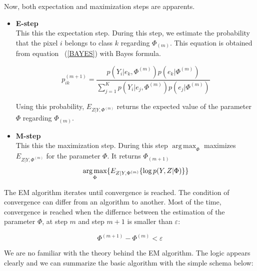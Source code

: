 Now, both expectation and maximization steps are apparents.\\
\begin{itemize}
\item \textbf{E-step}\\
This this the expectation step. During this step, we estimate the probability that the pixel $i$ belongs to class $k$ regarding $\Phi_{(m)}$. This equation is obtained from equation ~(\ref{BAYES}) with Bayes formula.

  \begin{equation}\label{ESTEP1}
  p_{ik}^{(m+1)} = \frac{p(Y_i|e_k,\Phi^{(m)})p(e_k|\Phi^{(m)})}{\sum_{j=1}^K   p(Y_i|e_j,\Phi^{(m)}) p(e_{j}|\Phi^{(m)})}  
  \end{equation}

Using this probability, $E_{Z|Y,\Phi^{(m)}}$ returns the expected value of the parameter $\Phi$ regarding $\Phi_{(m)}$.\\


\item \textbf{M-step}\\
This this the maximization step. During this step $\operatorname*{arg\,max}_\Phi$ maximizes $E_{Z|Y,\Phi^{(m)}}$ for the parameter $\Phi$. It returns $\Phi_{(m+1)}$
  \begin{equation}
  \operatorname*{arg\,max}_\Phi \{ E_{Z|Y,\Phi^{(m)}} \{\operatorname*{log} p(Y,Z|\Phi)\}\}\\
  \end{equation}
 
\end{itemize} 
  
The EM algorithm iterates until convergence is reached. The condition of convergence can differ from an algorithm to another. Most of the time, convergence is reached when the differnce between the estimation of the parameter $\Phi$, at step $m$ and step $m+1$ is smaller than $\varepsilon$:

  \begin{equation*}
  \Phi^{(m+1)}-\Phi^{(m)} < \varepsilon
  \end{equation*}
  
  
  We are no familiar with the theory behind the EM algorithm. The logic appears clearly and we can summarize the basic algorithm with the simple schema below:
   
